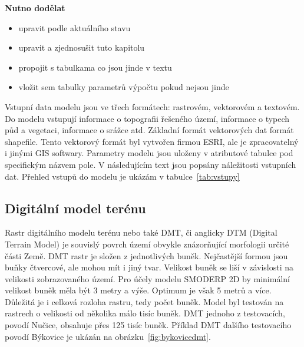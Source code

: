 
\textbf{Nutno dodělat}
\begin{itemize} \itemsep 0pt
\item upravit podle aktuálního stavu
\item upravit a zjednosušit tuto kapitolu
\item propojit s tabulkama co jsou jinde v textu
\item vložit sem tabulky parametrů výpočtu pokud nejsou jinde
\end{itemize}


Vstupní data modelu jsou ve třech formátech: rastrovém, vektorovém a textovém. Do modelu vstupují informace o topografii řešeného území, informace o typech půd a vegetaci, informace o srážce atd. Základní formát vektorových dat formát shapefile. Tento vektorový formát byl vytvořen firmou ESRI, ale je zpracovatelný i jinými GIS softwary. Parametry modelu jsou uloženy v atributové tabulce pod specifickým názvem pole. 
V následujícím text jsou popsány náležitosti vstupních dat. 
% 
Přehled vstupů do modelu je ukázám v tabulce~\ref{tab:vstupy}
% 
% 

% 

\subsection{Digitální model terénu} \label{sec:vstupdmt} 

Rastr digitálního modelu terénu nebo také DMT, či anglicky DTM (Digital Terrain Model) je souvislý povrch území obvykle znázorňující morfologii určité části Země. DMT rastr je složen z jednotlivých buněk. Nejčastější formou jsou buňky čtvercové, ale mohou mít i jiný tvar. Velikost buněk se liší v závislosti na velikosti zobrazovaného území. Pro účely modelu SMODERP 2D by minimální velikost buněk měla být 3 metry a výše. Optimum je však 5 metrů a více. Důležitá je i celková rozloha rastru, tedy počet buněk. Model byl testován na rastrech o velikosti od několika málo tisíc buněk. DMT jednoho z testovacích, povodí Nučice, obsahuje přes 125 tisíc buněk. Příklad DMT dalšího testovacího povodí Býkovice je ukázán na obrázku~\ref{fig:bykovicedmt}.


